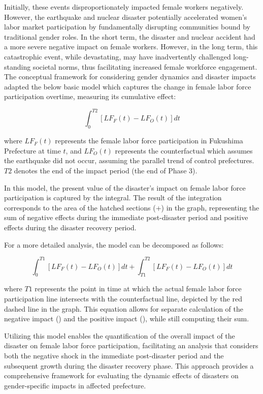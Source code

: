 \documentclass[12pt,halfline,a4paper]{ouparticle}
\begin{document}
Initially, these events disproportionately impacted female workers negatively. However, the earthquake and nuclear disaster potentially accelerated women's labor market participation by fundamentally disrupting communities bound by traditional gender roles. In the short term, the disaster and nuclear accident had a more severe negative impact on female workers. However, in the long term, this catastrophic event, while devastating, may have inadvertently challenged long-standing societal norms, thus facilitating increased female workforce engagement. The conceptual framework for considering gender dynamics and disaster impacts adapted the below basic model which captures the change in female labor force participation overtime, measuring its cumulative effect:

\begin{equation}
\int_0^{T2} [LF_F(t) - LF_O(t)] dt
\end{equation}

where $LF_F(t)$ represents the female labor force participation in Fukushima Prefecture at time $t$, and $LF_O(t)$ represents the counterfactual which assumes the earthquake did not occur, assuming the parallel trend of control prefectures. $T2$ denotes the end of the impact period (the end of Phase 3).

In this model, the present value of the disaster's impact on female labor force participation is captured by the integral. The result of the integration corresponds to the area of the hatched sections (+) in the graph, representing the sum of negative effects during the immediate post-disaster period and positive effects during the disaster recovery period.

For a more detailed analysis, the model can be decomposed as follows:

\begin{equation}
\int_0^{T1} [LF_F(t) - LF_O(t)] dt + \int_{T1}^{T2} [LF_F(t) - LF_O(t)] dt
\end{equation}

where $T1$ represents the point in time at which the actual female labor force participation line intersects with the counterfactual line, depicted by the red dashed line in the graph. This equation allows for separate calculation of the negative impact () and the positive impact (), while still computing their sum.

Utilizing this model enables the quantification of the overall impact of the disaster on female labor force participation, facilitating an analysis that considers both the negative shock in the immediate post-disaster period and the subsequent growth during the disaster recovery phase. This approach provides a comprehensive framework for evaluating the dynamic effects of disasters on gender-specific impacts in affected prefecture.
\end{document}
